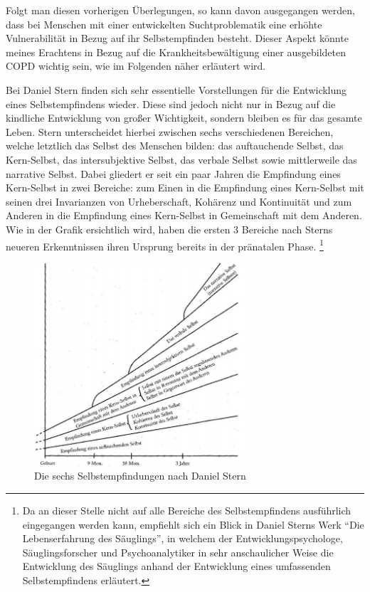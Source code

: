 Folgt man diesen vorherigen Überlegungen, so kann davon ausgegangen werden, dass bei Menschen mit einer entwickelten Suchtproblematik eine erhöhte Vulnerabilität in Bezug auf ihr Selbstempfinden besteht. Dieser Aspekt könnte meines Erachtens in Bezug auf die Krankheitsbewältigung einer ausgebildeten COPD wichtig sein, wie im Folgenden näher erläutert wird.

Bei Daniel Stern finden sich sehr essentielle Vorstellungen für die Entwicklung eines Selbstempfindens wieder. Diese sind jedoch nicht nur in Bezug auf die kindliche Entwicklung von großer Wichtigkeit, sondern bleiben es für das gesamte Leben. Stern unterscheidet hierbei zwischen sechs verschiedenen Bereichen, welche letztlich das Selbst des Menschen bilden: das auftauchende Selbst, das Kern-Selbst, das intersubjektive Selbst, das verbale Selbst sowie mittlerweile das narrative Selbst. Dabei gliedert er seit ein paar Jahren die Empfindung eines Kern-Selbst in zwei Bereiche: zum Einen in die Empfindung eines Kern-Selbst mit seinen drei Invarianzen von Urheberschaft, Kohärenz und Kontinuität und zum Anderen in die Empfindung eines Kern-Selbst in Gemeinschaft mit dem Anderen.  Wie in der Grafik ersichtlich wird, haben die ersten 3 Bereiche nach Sterns neueren Erkenntnissen ihren Ursprung bereits in der pränatalen Phase. \footnote{Da an dieser Stelle nicht auf alle Bereiche des Selbstempfindens ausführlich eingegangen werden kann, empfiehlt sich ein Blick in Daniel Sterns Werk "`Die Lebenserfahrung des Säuglings"', in welchem der Entwicklungspsychologe, Säuglingsforscher und Psychoanalytiker in sehr anschaulicher Weise die Entwicklung des Säuglings anhand der Entwicklung eines umfassenden Selbstempfindens erläutert.}


\begin{figure}
 \centering
  \includegraphics[width=0.7\textwidth]{selbstempfindungen}
  \caption{Die sechs Selbstempfindungen nach Daniel Stern}
  \label{fig:selbstempfindungen}
\end{figure}


